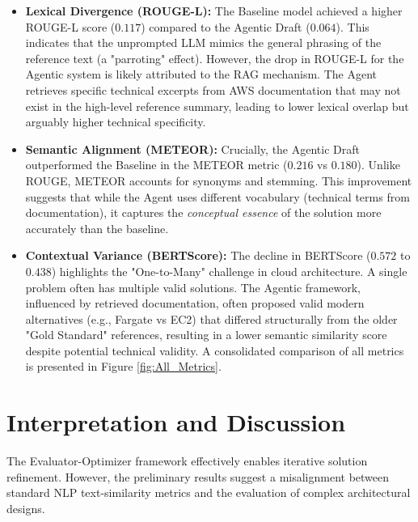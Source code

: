 \begin{itemize}
    \item \textbf{Lexical Divergence (ROUGE-L):} The Baseline model achieved a higher ROUGE-L score ($0.117$) compared to the Agentic Draft ($0.064$). This indicates that the unprompted LLM mimics the general phrasing of the reference text (a "parroting" effect). However, the drop in ROUGE-L for the Agentic system is likely attributed to the RAG mechanism. The Agent retrieves specific technical excerpts from AWS documentation that may not exist in the high-level reference summary, leading to lower lexical overlap but arguably higher technical specificity.
    \item \textbf{Semantic Alignment (METEOR):} Crucially, the Agentic Draft outperformed the Baseline in the METEOR metric ($0.216$ vs $0.180$). Unlike ROUGE, METEOR accounts for synonyms and stemming. This improvement suggests that while the Agent uses different vocabulary (technical terms from documentation), it captures the \textit{conceptual essence} of the solution more accurately than the baseline.
    \item \textbf{Contextual Variance (BERTScore):} The decline in BERTScore ($0.572$ to $0.438$) highlights the "One-to-Many" challenge in cloud architecture. A single problem often has multiple valid solutions. The Agentic framework, influenced by retrieved documentation, often proposed valid modern alternatives (e.g., Fargate vs EC2) that differed structurally from the older "Gold Standard" references, resulting in a lower semantic similarity score despite potential technical validity.    
    A consolidated comparison of all metrics is presented in Figure \ref{fig:All_Metrics}.
\end{itemize}

\section{Interpretation and Discussion}

The Evaluator-Optimizer framework effectively enables iterative solution refinement. However, the preliminary results suggest a misalignment between standard NLP text-similarity metrics and the evaluation of complex architectural designs.

